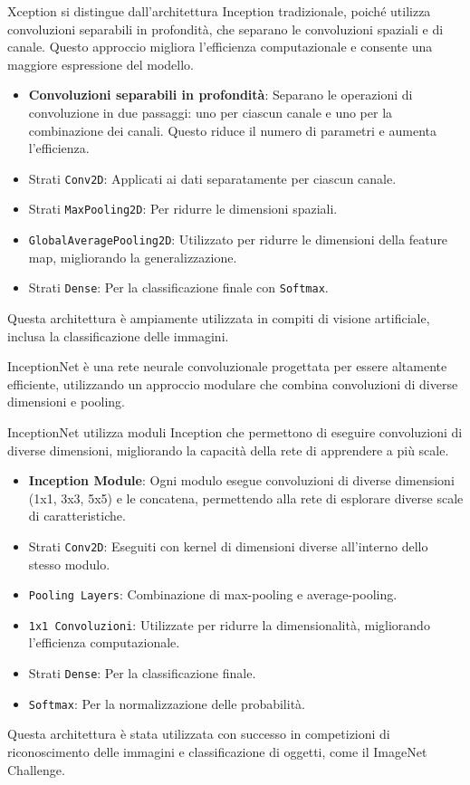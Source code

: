 Xception si distingue dall'architettura Inception tradizionale, poiché utilizza convoluzioni separabili in profondità, che separano le convoluzioni spaziali e di canale. Questo approccio migliora l'efficienza computazionale e consente una maggiore espressione del modello.
\begin{itemize}
    \item \textbf{Convoluzioni separabili in profondità}: Separano le operazioni di convoluzione in due passaggi: uno per ciascun canale e uno per la combinazione dei canali. Questo riduce il numero di parametri e aumenta l'efficienza.
    \item Strati \texttt{Conv2D}: Applicati ai dati separatamente per ciascun canale.
    \item Strati \texttt{MaxPooling2D}: Per ridurre le dimensioni spaziali.
    \item \texttt{GlobalAveragePooling2D}: Utilizzato per ridurre le dimensioni della feature map, migliorando la generalizzazione.
    \item Strati \texttt{Dense}: Per la classificazione finale con \texttt{Softmax}.
\end{itemize}
Questa architettura è ampiamente utilizzata in compiti di visione artificiale, inclusa la classificazione delle immagini.


InceptionNet è una rete neurale convoluzionale progettata per essere altamente efficiente, utilizzando un approccio modulare che combina convoluzioni di diverse dimensioni e pooling.

InceptionNet utilizza moduli Inception che permettono di eseguire convoluzioni di diverse dimensioni, migliorando la capacità della rete di apprendere a più scale.
\begin{itemize}
    \item \textbf{Inception Module}: Ogni modulo esegue convoluzioni di diverse dimensioni (1x1, 3x3, 5x5) e le concatena, permettendo alla rete di esplorare diverse scale di caratteristiche.
    \item Strati \texttt{Conv2D}: Eseguiti con kernel di dimensioni diverse all'interno dello stesso modulo.
    \item \texttt{Pooling Layers}: Combinazione di max-pooling e average-pooling.
    \item \texttt{1x1 Convoluzioni}: Utilizzate per ridurre la dimensionalità, migliorando l'efficienza computazionale.
    \item Strati \texttt{Dense}: Per la classificazione finale.
    \item \texttt{Softmax}: Per la normalizzazione delle probabilità.
\end{itemize}
Questa architettura è stata utilizzata con successo in competizioni di riconoscimento delle immagini e classificazione di oggetti, come il ImageNet Challenge.

